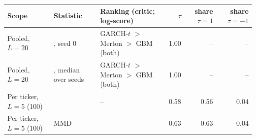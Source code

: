 \begin{tabular}{lllrrr}
\toprule
Scope & Statistic & Ranking (critic; log-score) & $\tau$ & share $\tau=1$ & share $\tau=-1$ \\
\midrule
Pooled, $L=20$ & \WC{}, seed 0 & GARCH-$t$ $>$ Merton $>$ GBM (both) & 1.00 & -- & -- \\
Pooled, $L=20$ & \WC{}, median over seeds & GARCH-$t$ $>$ Merton $>$ GBM (both) & 1.00 & -- & -- \\
Per ticker, $L=5$ (100) & \WC{} & -- & 0.58 & 0.56 & 0.04 \\
Per ticker, $L=5$ (100) & MMD & -- & 0.63 & 0.63 & 0.04 \\
\bottomrule
\end{tabular}
